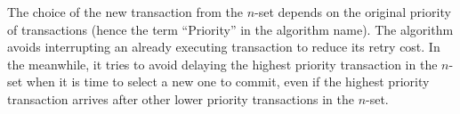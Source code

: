 \documentclass[twocolumn]{article}
\begin{document}
The choice of the new transaction
from the $n$-set depends on the original priority of transactions (hence the term  ``Priority'' in the algorithm name). The algorithm
avoids interrupting an already executing transaction to reduce its
retry cost. In the meanwhile, it tries to avoid delaying the highest priority
transaction in the $n$-set when it is time to select a new
one to commit, even if the highest priority transaction arrives after
other lower priority transactions in the $n$-set.

\end{document}
